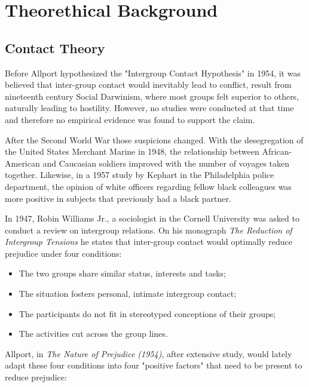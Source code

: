 \documentclass[runningheads]{llncs}
\begin{document}
\section{Theorethical Background}

\subsection{Contact Theory}
\par Before Allport hypothesized the "Intergroup Contact Hypothesis" in 1954, it was believed that inter-group contact would inevitably lead to conflict, result from nineteenth century Social Darwinism, where most groups felt superior to others, naturally leading to hostility. However, no studies were conducted at that time and therefore no empirical evidence was found to support the claim. 
\par After the Second World War those suspicions changed. With the desegregation of the United States Merchant Marine in 1948, the relationship between African-American and Caucasian soldiers improved with the number of voyages taken together. Likewise, in a 1957 study by Kephart in the Philadelphia police department, the opinion of white officers regarding fellow black colleagues was more positive in subjects that previously had a black partner.
\par In 1947, Robin Williams Jr., a sociologist in the Cornell University was asked to conduct a review on intergroup relations. On his monograph \textit{The Reduction of Intergroup Tensions} he states that inter-group contact would optimally reduce prejudice under four conditions:
\begin{itemize}
    \item The two groups share similar status, interests and tasks;
    \item The situation fosters personal, intimate intergroup contact;
    \item The participants do not fit in stereotyped conceptions of their groups;
    \item The activities cut across the group lines.
\end{itemize}
\par Allport, in \textit{The Nature of Prejudice (1954)}, after extensive study, would lately adapt these four conditions into four "positive factors" that need to be present to reduce prejudice:
\end{document}
